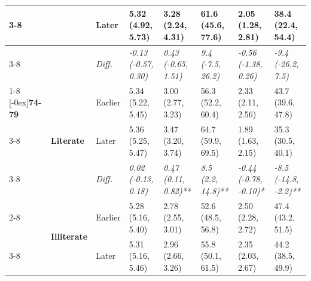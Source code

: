 \documentclass[12pt, a4paper]{article}
\begin{document}
\begin{appendices}
\begin{table}[!p]
{\begin{tabular}[t]{>{}l>{}lllllll}
        \cmidrule{3-8}
                                              &                                      & Later                         & 5.32 (4.92, 5.73)                           & 3.28 (2.24, 4.31)                           & 61.6 (45.6, 77.6)                           & 2.05 (1.28, 2.81)                               & 38.4 (22.4, 54.4)                              \\
        \cmidrule{3-8}
                                              &                                      & \cellcolor{gray!10}\em{Diff.} & \cellcolor{gray!10}\em{-0.13 (-0.57, 0.30)} & \cellcolor{gray!10}\em{0.43 (-0.65, 1.51)}  & \cellcolor{gray!10}\em{9.4 (-7.5, 26.2)}    & \cellcolor{gray!10}\em{-0.56 (-1.38, 0.26)}     & \cellcolor{gray!10}\em{-9.4 (-26.2, 7.5)}      \\
        \cmidrule{1-8}
        \multirow{9}{*}[-0ex]{\textbf{74-79}} & \multirow{3}{*}{\textbf{Literate}}   & Earlier                       & 5.34 (5.22, 5.45)                           & 3.00 (2.77, 3.23)                           & 56.3 (52.2, 60.4)                           & 2.33 (2.11, 2.56)                               & 43.7 (39.6, 47.8)                              \\
        \cmidrule{3-8}
                                              &                                      & Later                         & 5.36 (5.25, 5.47)                           & 3.47 (3.20, 3.74)                           & 64.7 (59.9, 69.5)                           & 1.89 (1.63, 2.15)                               & 35.3 (30.5, 40.1)                              \\
        \cmidrule{3-8}
                                              &                                      & \cellcolor{gray!10}\em{Diff.} & \cellcolor{gray!10}\em{0.02 (-0.13, 0.18)}  & \cellcolor{gray!10}\em{0.47 (0.11, 0.82)**} & \cellcolor{gray!10}\em{8.5 (2.2, 14.8)**}   & \cellcolor{gray!10}\em{-0.44 (-0.78, -0.10)*}   & \cellcolor{gray!10}\em{-8.5 (-14.8, -2.2)**}   \\
        \cmidrule{2-8}
                                              & \multirow{3}{*}{\textbf{Illiterate}} & Earlier                       & 5.28 (5.16, 5.40)                           & 2.78 (2.55, 3.01)                           & 52.6 (48.5, 56.8)                           & 2.50 (2.28, 2.72)                               & 47.4 (43.2, 51.5)                              \\
        \cmidrule{3-8}
                                              &                                      & Later                         & 5.31 (5.16, 5.46)                           & 2.96 (2.66, 3.26)                           & 55.8 (50.1, 61.5)                           & 2.35 (2.03, 2.67)                               & 44.2 (38.5, 49.9)                              \\

\end{tabular}}
\end{table}
\end{appendices}
\end{document}
